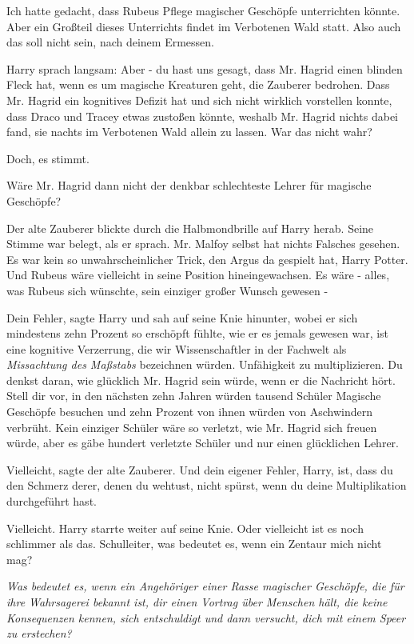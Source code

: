 \glqq{}Ich hatte gedacht, dass Rubeus Pflege magischer Geschöpfe unterrichten
könnte. Aber ein Großteil dieses Unterrichts findet im Verbotenen Wald statt.
Also auch das soll nicht sein, nach deinem Ermessen.\grqq{}

Harry sprach langsam: \glqq{}Aber - du hast uns gesagt, dass Mr. Hagrid einen
blinden Fleck hat, wenn es um magische Kreaturen geht, die Zauberer bedrohen.
Dass Mr. Hagrid ein kognitives Defizit hat und sich nicht wirklich vorstellen
konnte, dass Draco und Tracey etwas zustoßen könnte, weshalb Mr. Hagrid nichts
dabei fand, sie nachts im Verbotenen Wald allein zu lassen. War das nicht wahr?\grqq{}

\glqq{}Doch, es stimmt.\grqq{}

\glqq{}Wäre Mr. Hagrid dann nicht der denkbar schlechteste Lehrer für magische
Geschöpfe?\grqq{}

Der alte Zauberer blickte durch die Halbmondbrille auf Harry herab. Seine Stimme
war belegt, als er sprach. \glqq{}Mr. Malfoy selbst hat nichts Falsches gesehen.
Es war kein so unwahrscheinlicher Trick, den Argus da gespielt hat, Harry
Potter. Und Rubeus wäre vielleicht in seine Position hineingewachsen. Es wäre -
alles, was Rubeus sich wünschte, sein einziger großer Wunsch gewesen -\grqq{}

\glqq{}Dein Fehler\grqq{}, sagte Harry und sah auf seine Knie hinunter, wobei er
sich mindestens zehn Prozent so erschöpft fühlte, wie er es jemals gewesen war,
\glqq{}ist eine kognitive Verzerrung, die wir Wissenschaftler in der Fachwelt als
\emph{Missachtung des Maßstabs} bezeichnen würden. Unfähigkeit zu
multiplizieren. Du denkst daran, wie glücklich Mr. Hagrid sein würde, wenn er
die Nachricht hört. Stell dir vor, in den nächsten zehn Jahren würden tausend
Schüler Magische Geschöpfe besuchen und zehn Prozent von ihnen würden von
Aschwindern verbrüht. Kein einziger Schüler wäre so verletzt, wie Mr. Hagrid
sich freuen würde, aber es gäbe hundert verletzte Schüler und nur einen
glücklichen Lehrer.\grqq{}

\glqq{}Vielleicht\grqq{}, sagte der alte Zauberer. \glqq{}Und dein eigener Fehler,
Harry, ist, dass du den Schmerz derer, denen du wehtust, nicht spürst, wenn du
deine Multiplikation durchgeführt hast.\grqq{}

\glqq{}Vielleicht.\grqq{} Harry starrte weiter auf seine Knie. \glqq{}Oder
vielleicht ist es noch schlimmer als das. Schulleiter, was bedeutet es, wenn ein
Zentaur mich nicht mag?\grqq{}

\emph{Was bedeutet es, wenn ein Angehöriger einer Rasse magischer Geschöpfe, die
für ihre Wahrsagerei bekannt ist, dir einen Vortrag über Menschen hält, die
keine Konsequenzen kennen, sich entschuldigt und dann versucht, dich mit einem
Speer zu erstechen?}

